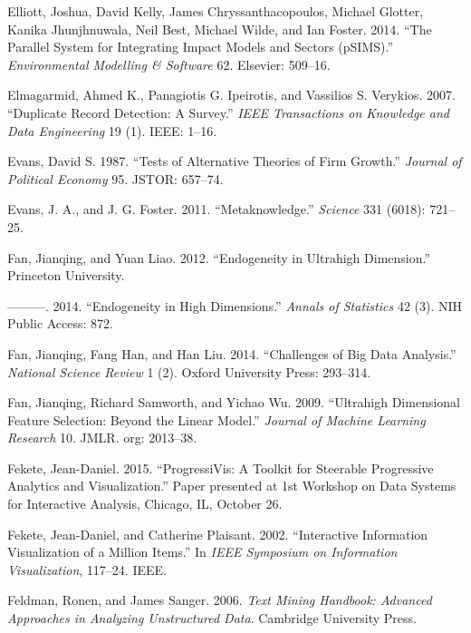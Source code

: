 \documentclass[]{krantz}
\begin{document}
\hypertarget{ref-elliott2014parallel}{}
Elliott, Joshua, David Kelly, James Chryssanthacopoulos, Michael
Glotter, Kanika Jhunjhnuwala, Neil Best, Michael Wilde, and Ian Foster.
2014. ``The Parallel System for Integrating Impact Models and Sectors
(pSIMS).'' \emph{Environmental Modelling \& Software} 62. Elsevier:
509--16.

\hypertarget{ref-elmagarmid2007duplicate}{}
Elmagarmid, Ahmed K., Panagiotis G. Ipeirotis, and Vassilios S.
Verykios. 2007. ``Duplicate Record Detection: A Survey.'' \emph{IEEE
Transactions on Knowledge and Data Engineering} 19 (1). IEEE: 1--16.

\hypertarget{ref-evans1987tests}{}
Evans, David S. 1987. ``Tests of Alternative Theories of Firm Growth.''
\emph{Journal of Political Economy} 95. JSTOR: 657--74.

\hypertarget{ref-Evans2011}{}
Evans, J. A., and J. G. Foster. 2011. ``Metaknowledge.'' \emph{Science}
331 (6018): 721--25.

\hypertarget{ref-FanLiao2012}{}
Fan, Jianqing, and Yuan Liao. 2012. ``Endogeneity in Ultrahigh
Dimension.'' Princeton University.

\hypertarget{ref-fan2014endogeneity}{}
---------. 2014. ``Endogeneity in High Dimensions.'' \emph{Annals of
Statistics} 42 (3). NIH Public Access: 872.

\hypertarget{ref-fan2014challenges}{}
Fan, Jianqing, Fang Han, and Han Liu. 2014. ``Challenges of Big Data
Analysis.'' \emph{National Science Review} 1 (2). Oxford University
Press: 293--314.

\hypertarget{ref-fan2009ultrahigh}{}
Fan, Jianqing, Richard Samworth, and Yichao Wu. 2009. ``Ultrahigh
Dimensional Feature Selection: Beyond the Linear Model.'' \emph{Journal
of Machine Learning Research} 10. JMLR. org: 2013--38.

\hypertarget{ref-fekete2015progressivis}{}
Fekete, Jean-Daniel. 2015. ``ProgressiVis: A Toolkit for Steerable
Progressive Analytics and Visualization.'' Paper presented at 1st
Workshop on Data Systems for Interactive Analysis, Chicago, IL, October
26.

\hypertarget{ref-fekete2002interactive}{}
Fekete, Jean-Daniel, and Catherine Plaisant. 2002. ``Interactive
Information Visualization of a Million Items.'' In \emph{IEEE Symposium
on Information Visualization}, 117--24. IEEE.

\hypertarget{ref-FeldmanSanger}{}
Feldman, Ronen, and James Sanger. 2006. \emph{Text Mining Handbook:
Advanced Approaches in Analyzing Unstructured Data}. Cambridge
University Press.
\end{document}
